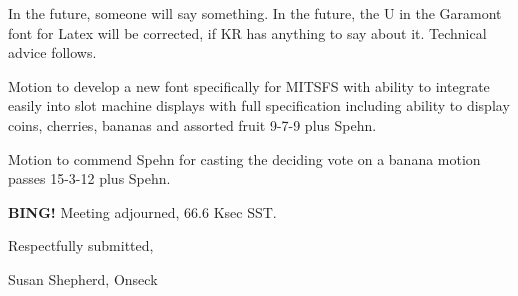 \documentclass[10pt]{article}
\newcommand{\bing}{{\bf BING!} }
\newcommand{\ps}{ plus Spehn\xspace}
\begin{document}
In the future, someone will say something. In the future, the U in the Garamont font for Latex will be corrected, if KR has anything to say about it. Technical advice follows.

Motion to develop a new font specifically for MITSFS with ability to integrate easily into slot machine displays with full specification including ability to display coins, cherries, bananas and assorted fruit 9-7-9\ps.

Motion to commend Spehn for casting the deciding vote on a banana motion passes 15-3-12\ps. 

\bing
\noindent
Meeting adjourned, 66.6 Ksec SST.

\vspace{18pt}

\centerline{Respectfully submitted,}
\centerline{Susan Shepherd, Onseck}
\end{document}
